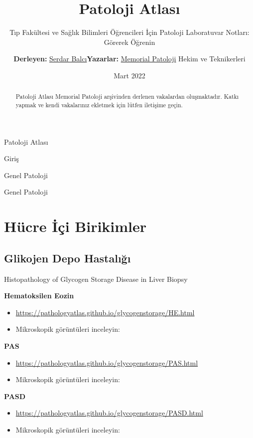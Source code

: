 \documentclass[
  letterpaper,
  DIV=11,
  numbers=noendperiod]{scrreprt}
\title{Patoloji Atlası}
\subtitle{Tıp Fakültesi ve Sağlık Bilimleri Öğrencileri İçin Patoloji
Laboratuvar Notları: Görerek Öğrenin}
\author{\begin{itemize}
\tightlist
\item
  \textbf{Derleyen:} \href{https://www.serdarbalci.com}{Serdar Balcı}
\item
  \textbf{Yazarlar:} \href{https://MemorialPath.github.io}{Memorial
  Patoloji} Hekim ve Teknikerleri
\end{itemize}}
\date{Mart 2022}
\renewcommand*\contentsname{Table of contents}
\begin{document}
\maketitle
\begin{abstract}
Patoloji Atlası Memorial Patoloji arşivinden derlenen vakalardan
oluşmaktadır. Katkı yapmak ve kendi vakalarınız ekletmek için lütfen
iletişime geçin.
\end{abstract}

\renewcommand*\contentsname{Table of contents}
{
\hypersetup{linkcolor=}
\setcounter{tocdepth}{2}
\tableofcontents
}
Patoloji Atlası

Giriş

Genel Patoloji

Genel Patoloji

\hypertarget{huxfccre-iuxe7i-birikimler}{%
\chapter{Hücre İçi Birikimler}\label{huxfccre-iuxe7i-birikimler}}

\hypertarget{glikojen-depo-hastalux131ux11fux131}{%
\section{Glikojen Depo
Hastalığı}\label{glikojen-depo-hastalux131ux11fux131}}

Histopathology of Glycogen Storage Disease in Liver Biopsy

\textbf{Hematoksilen Eozin}

\begin{itemize}
\item
  \url{https://pathologyatlas.github.io/glycogenstorage/HE.html}
\item
  Mikroskopik görüntüleri inceleyin:
\end{itemize}

\textbf{PAS}

\begin{itemize}
\item
  \url{https://pathologyatlas.github.io/glycogenstorage/PAS.html}
\item
  Mikroskopik görüntüleri inceleyin:
\end{itemize}

\textbf{PASD}

\begin{itemize}
\item
  \url{https://pathologyatlas.github.io/glycogenstorage/PASD.html}
\item
  Mikroskopik görüntüleri inceleyin:
\end{itemize}
\end{document}
